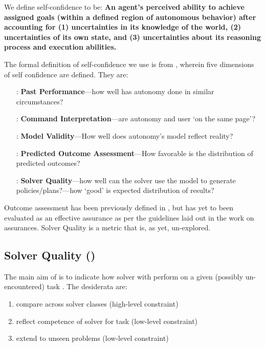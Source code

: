     We define self-confidence to be: \textbf{An agent's perceived ability to achieve assigned goals (within a defined region of autonomous behavior) after accounting for (1) uncertainties in its knowledge of the world, (2) uncertainties of its own state, and (3) uncertainties about its reasoning process and execution abilities.}

    The formal definition of self-confidence we use is from \cite{Aitken2016-cv}, wherein five dimensions of self confidence are defined. They are:

        \begin{itemize}
            \item [\xH{}:] \textbf{Past Performance}---how well has autonomy done in similar circumstances?
            \item [\xI{}:] \textbf{Command Interpretation}---are autonomy and user `on the same page'?
            \item [\xM{}:] \textbf{Model Validity}---How well does autonomy's model reflect reality?
            \item [\xP{}:] \textbf{Predicted Outcome Assessment}---How favorable is the distribution of predicted outcomes?
            \item [\xQ{}:] \textbf{Solver Quality}---how well can the solver use the model to generate policies/plans?---how `good' is expected distribution of results?
        \end{itemize}

    Outcome assessment has been previously defined in \cite{Aitken2016-cv}, but has yet to been evaluated as an effective assurance as per the guidelines laid out in the work on assurances. Solver Quality is a metric that is, as yet, un-explored.

\subsection{Solver Quality (\xQ)} \label{sec:SQ}
    The main aim of \xQ{} is to indicate how solver \solve{} with perform on a given (possibly un-encountered) task \task{}. The desiderata are:

    \begin{enumerate}[label=\textbf{D\arabic*}]
        \item compare across solver classes (high-level constraint)\label{itm:d1}
        \item reflect competence of solver \solve{} for task \task{} (low-level constraint)\label{itm:d2}
        \item extend to unseen problems (low-level constraint)\label{itm:d3}
    \end{enumerate}

